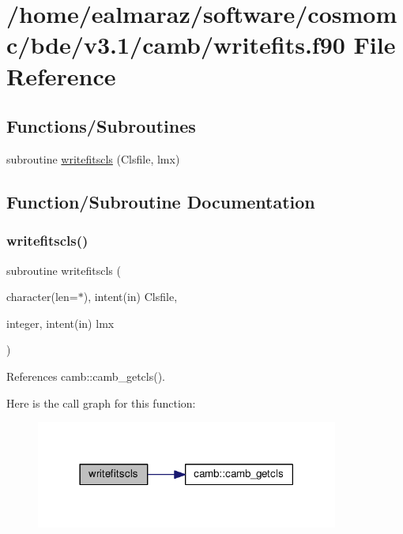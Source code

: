 \hypertarget{writefits_8f90}{}\section{/home/ealmaraz/software/cosmomc/bde/v3.1/camb/writefits.f90 File Reference}
\label{writefits_8f90}
\subsection*{Functions/\+Subroutines}
\begin{DoxyCompactItemize}
\item 
subroutine \mbox{\hyperlink{writefits_8f90_a6f2bf5fdce1cc2450c5a1a9d567167b5}{writefitscls}} (Clsfile, lmx)
\end{DoxyCompactItemize}


\subsection{Function/\+Subroutine Documentation}
\mbox{\label{writefits_8f90_a6f2bf5fdce1cc2450c5a1a9d567167b5}} 
\subsubsection{\texorpdfstring{writefitscls()}{writefitscls()}}
{\footnotesize\ttfamily subroutine writefitscls (\begin{DoxyParamCaption}\item[{character(len=$\ast$), intent(in)}]{Clsfile,  }\item[{integer, intent(in)}]{lmx }\end{DoxyParamCaption})}



References camb\+::camb\+\_\+getcls().

Here is the call graph for this function\+:
\nopagebreak
\begin{figure}[H]
\begin{center}
\leavevmode
\includegraphics[width=282pt]{writefits_8f90_a6f2bf5fdce1cc2450c5a1a9d567167b5_cgraph}
\end{center}
\end{figure}
